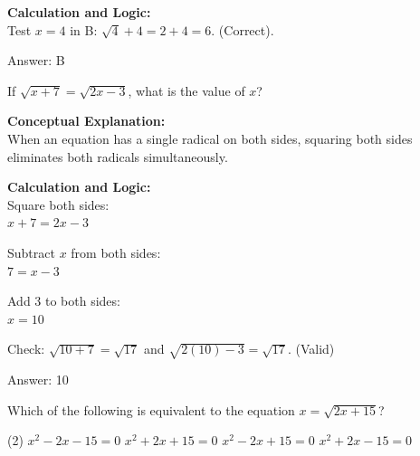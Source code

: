 \documentclass[11pt,paper=a4,answers]{exam}
\begin{document}
\begin{questions}
\begin{solution}
\textbf{Calculation and Logic:} \\
Test $x=4$ in B: $\sqrt{4} + 4 = 2 + 4 = 6$. (Correct).

\vspace{25pt}

Answer: \colorbox{yellow!100}{B}
\end{solution}


\question
If $\sqrt{x + 7} = \sqrt{2x - 3}$, what is the value of $x$?

\begin{solution}
\textbf{Conceptual Explanation:} \\
When an equation has a single radical on both sides, squaring both sides eliminates both radicals simultaneously. 

\vspace{20pt}

\textbf{Calculation and Logic:} \\
Square both sides: \\
$x + 7 = 2x - 3$

\vspace{10pt}

Subtract $x$ from both sides: \\
$7 = x - 3$

\vspace{10pt}

Add 3 to both sides: \\
$x = 10$

\vspace{10pt}

Check: $\sqrt{10+7} = \sqrt{17}$ and $\sqrt{2(10)-3} = \sqrt{17}$. (Valid)

\vspace{25pt}

Answer: \colorbox{yellow!100}{10}
\end{solution}

\vspace{40pt}

\question
Which of the following is equivalent to the equation $x = \sqrt{2x + 15}$?
\begin{tasks}(2)
    \task $x^2 - 2x - 15 = 0$
    \task $x^2 + 2x + 15 = 0$
    \task $x^2 - 2x + 15 = 0$
    \task $x^2 + 2x - 15 = 0$
\end{tasks}


\end{questions}
\end{document}
